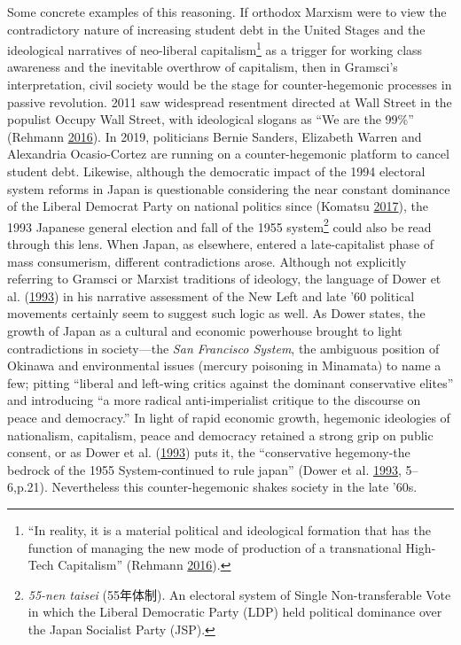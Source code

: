 \documentclass[10pt,british,A4paper,,openany]{memoir}
\begin{document}
Some concrete examples of this reasoning. If orthodox Marxism were to
view the contradictory nature of increasing student debt in the United
Stages and the ideological narratives of neo-liberal
capitalism\footnote{``In reality, it is a material political and
  ideological formation that has the function of managing the new mode
  of production of a transnational High-Tech Capitalism'' (Rehmann
  \protect\hyperlink{ref-rehmann_bernie_2016}{2016}).} as a trigger for
working class awareness and the inevitable overthrow of capitalism, then
in Gramsci's interpretation, civil society would be the stage for
counter-hegemonic processes in passive revolution. 2011 saw widespread
resentment directed at Wall Street in the populist Occupy Wall Street,
with ideological slogans as ``We are the 99\%'' (Rehmann
\protect\hyperlink{ref-rehmann_bernie_2016}{2016}). In 2019, politicians
Bernie Sanders, Elizabeth Warren and Alexandria Ocasio-Cortez are
running on a counter-hegemonic platform to cancel student debt.
Likewise, although the democratic impact of the 1994 electoral system
reforms in Japan is questionable considering the near constant dominance
of the Liberal Democrat Party on national politics since (Komatsu
\protect\hyperlink{ref-komatsu_first_2017}{2017}), the 1993 Japanese
general election and fall of the 1955 system\footnote{\emph{55-nen
  taisei} (55年体制). An electoral system of Single Non-transferable
  Vote in which the Liberal Democratic Party (LDP) held political
  dominance over the Japan Socialist Party (JSP).} could also be read
through this lens. When Japan, as elsewhere, entered a late-capitalist
phase of mass consumerism, different contradictions arose. Although not
explicitly referring to Gramsci or Marxist traditions of ideology, the
language of Dower et al.
(\protect\hyperlink{ref-dower_peace_1993}{1993}) in his narrative
assessment of the New Left and late '60 political movements certainly
seem to suggest such logic as well. As Dower states, the growth of Japan
as a cultural and economic powerhouse brought to light contradictions in
society---the \emph{San Francisco System}, the ambiguous position of
Okinawa and environmental issues (mercury poisoning in Minamata) to name
a few; pitting ``liberal and left-wing critics against the dominant
conservative elites'' and introducing ``a more radical anti-imperialist
critique to the discourse on peace and democracy.'' In light of rapid
economic growth, hegemonic ideologies of nationalism, capitalism, peace
and democracy retained a strong grip on public consent, or as Dower et
al. (\protect\hyperlink{ref-dower_peace_1993}{1993}) puts it, the
``conservative hegemony-the bedrock of the 1955 System-continued to rule
japan'' (Dower et al. \protect\hyperlink{ref-dower_peace_1993}{1993},
5--6,p.21). Nevertheless this counter-hegemonic shakes society in the
late '60s.
\end{document}
